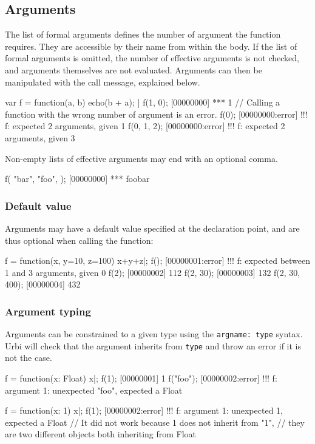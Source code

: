 \subsection{Arguments}

The list of formal arguments defines the number of argument the function
requires. They are accessible by their name from within the body. If the
list of formal arguments is omitted, the number of effective arguments is
not checked, and arguments themselves are not evaluated. Arguments can then
be manipulated with the call message, explained below.

\begin{urbiscript}
var f = function(a, b) {
  echo(b + a);
}|
f(1, 0);
[00000000] *** 1
// Calling a function with the wrong number of argument is an error.
f(0);
[00000000:error] !!! f: expected 2 arguments, given 1
f(0, 1, 2);
[00000000:error] !!! f: expected 2 arguments, given 3
\end{urbiscript}

Non-empty lists of effective arguments may end with an optional comma.
\begin{urbiscript}
f(
  "bar",
  "foo",
 );
[00000000] *** foobar
\end{urbiscript}

\subsubsection{Default value}

Arguments may have a default value specified at the declaration point, and
are thus optional when calling the function:

\begin{urbiscript}
f = function(x, y=10, z=100) { x+y+z}|;
f();
[00000001:error] !!! f: expected between 1 and 3 arguments, given 0
f(2);
[00000002] 112
f(2, 30);
[00000003] 132
f(2, 30, 400);
[00000004] 432
\end{urbiscript}

\subsubsection{Argument typing}
\label{sec:lang:argtype}
Arguments can be constrained to a given type using the \lstinline{argname: type}
syntax. Urbi will check that the argument inherits from \lstinline{type} and
throw an error if it is not the case.

\begin{urbiscript}
f = function(x: Float) {x}|;
f(1);
[00000001] 1
f("foo");
[00000002:error] !!! f: argument 1: unexpected "foo", expected a Float

f = function(x: 1) {x}|;
f(1);
[00000002:error] !!! f: argument 1: unexpected 1, expected a Float
// It did not work because 1 does not inherit from "1",
// they are two different objects both inheriting from Float
\end{urbiscript}

